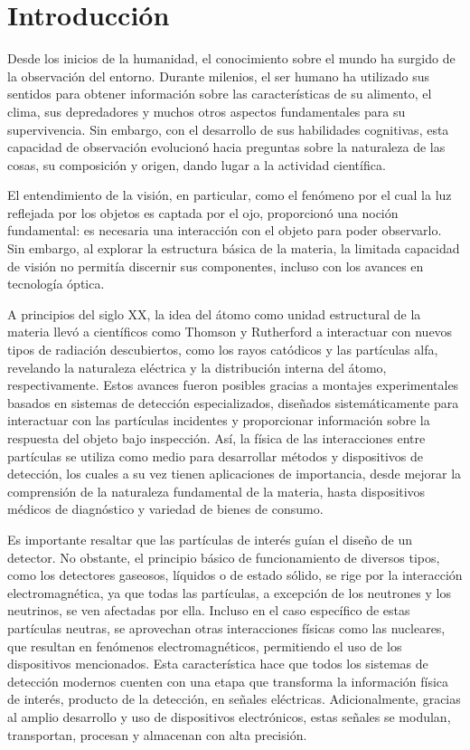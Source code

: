 \documentclass[]{book}
\begin{document}
\chapter{Introducción}

Desde los inicios de la humanidad, el conocimiento sobre el mundo ha surgido de la observación del entorno. Durante milenios, el ser humano ha utilizado sus sentidos para obtener información sobre las características de su alimento, el clima, sus depredadores y muchos otros aspectos fundamentales para su supervivencia. Sin embargo, con el desarrollo de sus habilidades cognitivas, esta capacidad de observación evolucionó hacia preguntas sobre la naturaleza de las cosas, su composición y origen, dando lugar a la actividad científica.

\noindent El entendimiento de la visión, en particular, como el fenómeno por el cual la luz reflejada por los objetos es captada por el ojo, proporcionó una noción fundamental: es necesaria una interacción con el objeto para poder observarlo. Sin embargo, al explorar la estructura básica de la materia, la limitada capacidad de visión no permitía discernir sus componentes, incluso con los avances en tecnología óptica.

\noindent A principios del siglo XX, la idea del átomo como unidad estructural de la materia llevó a científicos como Thomson y Rutherford a interactuar con nuevos tipos de radiación descubiertos, como los rayos catódicos y las partículas alfa, revelando la naturaleza eléctrica y la distribución interna del átomo, respectivamente. Estos avances fueron posibles gracias a montajes experimentales basados en sistemas de detección especializados, diseñados sistemáticamente para interactuar con las partículas incidentes y proporcionar información sobre la respuesta del objeto bajo inspección. Así, la física de las interacciones entre partículas se utiliza como medio para desarrollar métodos y dispositivos de detección, los cuales a su vez tienen aplicaciones de importancia, desde mejorar la comprensión de la naturaleza fundamental de la materia, hasta dispositivos médicos de diagnóstico y variedad de bienes de consumo.

\noindent Es importante resaltar que las partículas de interés guían el diseño de un detector. No obstante, el principio básico de funcionamiento de diversos tipos, como los detectores gaseosos, líquidos o de estado sólido, se rige por la interacción electromagnética, ya que todas las partículas, a excepción de los neutrones y los neutrinos, se ven afectadas por ella. Incluso en el caso específico de estas partículas neutras, se aprovechan otras interacciones físicas como las nucleares, que resultan en fenómenos electromagnéticos, permitiendo el uso de los dispositivos mencionados. Esta característica hace que todos los sistemas de detección modernos cuenten con una etapa que transforma la información física de interés, producto de la detección, en señales eléctricas. Adicionalmente, gracias al amplio desarrollo y uso de dispositivos electrónicos, estas señales se modulan, transportan, procesan y almacenan con alta precisión.
\end{document}
